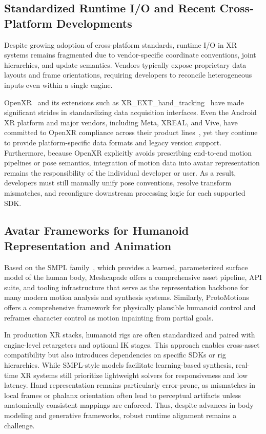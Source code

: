 \subsection*{Standardized Runtime I/O and Recent Cross-Platform Developments}
Despite growing adoption of cross-platform standards, runtime I/O in XR systems remains fragmented due to vendor-specific coordinate conventions, joint hierarchies, and update semantics. 
Vendors typically expose proprietary data layouts and frame orientations, requiring developers to reconcile heterogeneous inputs even within a single engine. 

OpenXR~\cite{khronos_openxr_1_0} and its extensions such as XR\_EXT\_hand\_tracking~\cite{openxr_ext_hand} have made significant strides in standardizing data acquisition interfaces. 
Even the Android XR platform and major vendors, including Meta, XREAL, and Vive, have committed to OpenXR compliance across their product lines~\cite{android_xr_sdk_2024,meta_and_openxr_2025,xreal_sdk_3_0_2024,vive_openxr_2024}, yet they continue to provide platform-specific data formats and legacy version support.
Furthermore, because OpenXR explicitly avoids prescribing end-to-end motion pipelines or pose semantics, integration of motion data into avatar representation remains the responsibility of the individual developer or user.
As a result, developers must still manually unify pose conventions, resolve transform mismatches, and reconfigure downstream processing logic for each supported SDK.

\subsection*{Avatar Frameworks for Humanoid Representation and Animation}
Based on the SMPL family~\cite{loper2015smpl}, which provides a learned, parameterized surface model of the human body, Meshcapade offers a comprehensive asset pipeline, API suite, and tooling infrastructure that serve as the representation backbone for many modern motion analysis and synthesis systems. Similarly, ProtoMotions~\cite{ProtoMotions} offers a comprehensive framework for physically plausible humanoid control and reframes character control as motion inpainting from partial goals.

In production XR stacks, humanoid rigs are often standardized and paired with engine-level retargeters and optional IK stages. This approach enables cross-asset compatibility but also introduces dependencies on specific SDKs or rig hierarchies. While SMPL-style models facilitate learning-based synthesis, real-time XR systems still prioritize lightweight solvers for responsiveness and low latency. Hand representation remains particularly error-prone, as mismatches in local frames or phalanx orientation often lead to perceptual artifacts unless anatomically consistent mappings are enforced. Thus, despite advances in body modeling and generative frameworks, robust runtime alignment remains a challenge.\\

